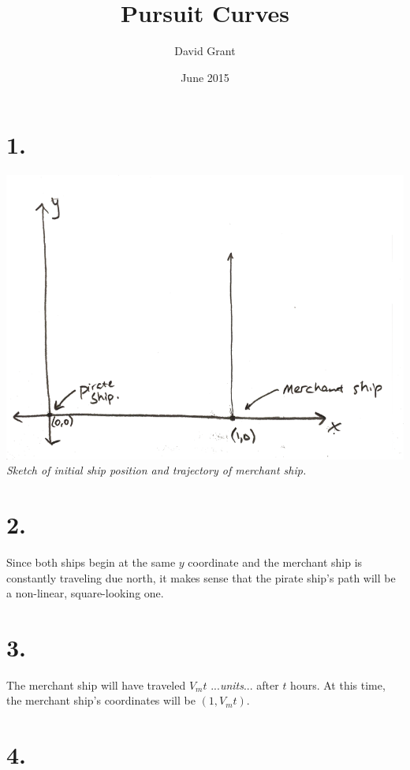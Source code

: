 \documentclass[11pt]{report}
\title{Pursuit Curves}
\author{David Grant}
\date{June 2015}
\begin{document}
\maketitle

\section*{1.}

\begin{center}
\includegraphics[width=\linewidth]{sketch1}
\textit{Sketch of initial ship position and trajectory of
merchant ship.} 
\end{center}

\section*{2.}

Since both ships begin at the same $y$ coordinate and the merchant
ship is constantly traveling due north, it makes sense that the pirate ship's path will be a non-linear, square-looking one.

\section*{3.}

The merchant ship will have traveled $V_{m}t$ ...\textit{units}... after $t$ hours. At this time, the merchant ship's coordinates will be $(1, V_{m}t)$.

\section*{4.}
\end{document}
